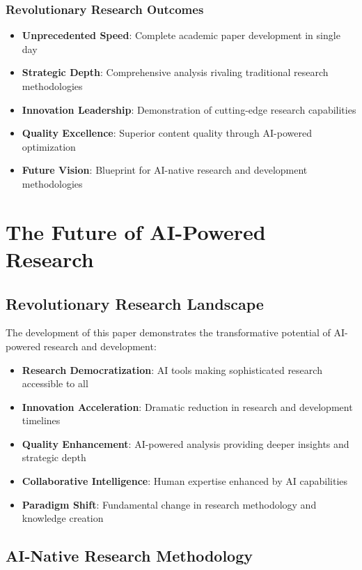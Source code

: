 \documentclass[12pt,a4paper]{book}
\begin{document}
\subsubsection{Revolutionary Research Outcomes}

\begin{itemize}
    \item \textbf{Unprecedented Speed}: Complete academic paper development in single day
    \item \textbf{Strategic Depth}: Comprehensive analysis rivaling traditional research methodologies
    \item \textbf{Innovation Leadership}: Demonstration of cutting-edge research capabilities
    \item \textbf{Quality Excellence}: Superior content quality through AI-powered optimization
    \item \textbf{Future Vision}: Blueprint for AI-native research and development methodologies
\end{itemize}

\section{The Future of AI-Powered Research}

\subsection{Revolutionary Research Landscape}

The development of this paper demonstrates the transformative potential of AI-powered research and development:

\begin{itemize}
    \item \textbf{Research Democratization}: AI tools making sophisticated research accessible to all
    \item \textbf{Innovation Acceleration}: Dramatic reduction in research and development timelines
    \item \textbf{Quality Enhancement}: AI-powered analysis providing deeper insights and strategic depth
    \item \textbf{Collaborative Intelligence}: Human expertise enhanced by AI capabilities
    \item \textbf{Paradigm Shift}: Fundamental change in research methodology and knowledge creation
\end{itemize}

\subsection{AI-Native Research Methodology}
\end{document}
